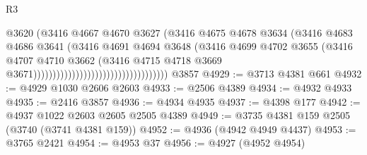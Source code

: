 \begin{lexlean}{R3}
\begin{coremodule}
                                                            @3620
                                                            (@3416
                                                              @4667
                                                              @4670
                                                              @3627
                                                              (@3416
                                                                @4675
                                                                @4678
                                                                @3634
                                                                (@3416
                                                                  @4683
                                                                  @4686
                                                                  @3641
                                                                  (@3416
                                                                    @4691
                                                                    @4694
                                                                    @3648
                                                                    (@3416
                                                                      @4699
                                                                      @4702
                                                                      @3655
                                                                      (@3416
                                                                        @4707
                                                                        @4710
                                                                        @3662
                                                                        (@3416
                                                                          @4715
                                                                          @4718
                                                                          @3669
                                                                          @3671)))))))))))))))))))))))))))))))))))
    @3857
@4929 := @3713 @4381 @661
@4932 := @4929 @1030 @2606 @2603
@4933 := @2506 @4389
@4934 := @4932 @4933
@4935 := @2416 @3857
@4936 := @4934 @4935
@4937 := @4398 @177
@4942 := @4937 @1022 @2603 @2605 @2505 @4389
@4949 := @3735 @4381 @159 @2505 (@3740 (@3741 @4381 @159))
@4952 := @4936 (@4942 @4949 @4437)
@4953 := @3765 @2421
@4954 := @4953 @37
@4956 := @4927 (@4952 @4954)

\end{coremodule}
\end{lexlean}
